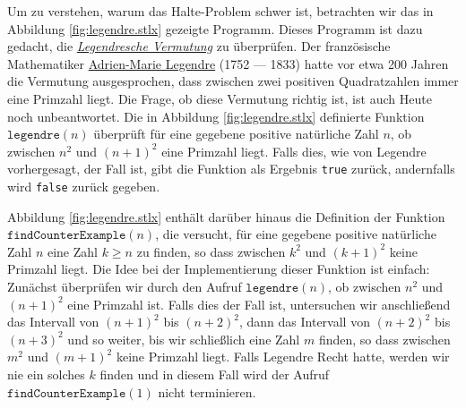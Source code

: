 Um zu verstehen, warum das Halte-Problem schwer ist, betrachten wir  
das in Abbildung \ref{fig:legendre.stlx} gezeigte Programm. 
Dieses Programm ist dazu gedacht, die
\href{http://de.wikipedia.org/wiki/Legendresche_Vermutung}{\emph{Legendresche Vermutung}} zu
\"{u}berpr\"{u}fen.  Der franz\"{o}sische 
Mathematiker  \href{http://de.wikipedia.org/wiki/Adrien-Marie_Legendre}{Adrien-Marie Legendre} 
(1752 --- 1833) hatte vor etwa 200 Jahren die Vermutung 
ausgesprochen, dass zwischen zwei positiven Quadratzahlen immer eine Primzahl liegt.  Die Frage, ob diese
Vermutung richtig ist, ist auch Heute noch unbeantwortet.  Die in Abbildung \ref{fig:legendre.stlx}
definierte Funktion $\texttt{legendre}(n)$ \"{u}berpr\"{u}ft f\"{u}r eine gegebene positive nat\"{u}rliche Zahl $n$,
ob zwischen $n^2$ und $(n+1)^2$ eine Primzahl liegt.  Falls dies, wie von Legendre vorhergesagt, der
Fall ist, gibt die Funktion als Ergebnis \texttt{true} zur\"{u}ck, andernfalls wird \texttt{false}
zur\"{u}ck gegeben.

Abbildung \ref{fig:legendre.stlx} enth\"{a}lt dar\"{u}ber hinaus die Definition der Funktion
$\texttt{findCounterExample}(n)$, die versucht, f\"{u}r eine gegebene positive nat\"{u}rliche Zahl $n$ eine
Zahl $k \geq n$ zu finden, so dass zwischen $k^2$ und $(k+1)^2$ keine Primzahl liegt.  Die Idee bei
der Implementierung dieser Funktion ist einfach:  Zun\"{a}chst \"{u}berpr\"{u}fen wir durch den Aufruf
$\texttt{legendre}(n)$, ob zwischen $n^2$ und $(n+1)^2$
eine Primzahl ist.  Falls dies der Fall ist, untersuchen wir anschlie\ss{}end das Intervall von
$(n+1)^2$ bis $(n+2)^2$, dann das Intervall von 
$(n+2)^2$ bis $(n+3)^2$ und so weiter, bis wir schlie\ss{}lich eine Zahl $m$ finden, so dass zwischen
$m^2$ und $(m+1)^2$ keine Primzahl liegt.  Falls Legendre Recht hatte, werden wir nie ein solches
$k$ finden und in diesem Fall wird der Aufruf $\texttt{findCounterExample}(1)$ nicht terminieren. 

